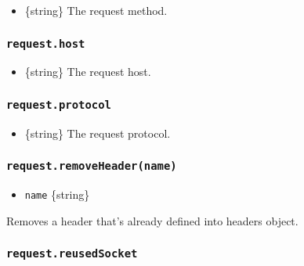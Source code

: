 \begin{itemize}
\tightlist
\item
  \{string\} The request method.
\end{itemize}

\subsubsection{\texorpdfstring{\texttt{request.host}}{request.host}}\label{request.host}

\begin{itemize}
\tightlist
\item
  \{string\} The request host.
\end{itemize}

\subsubsection{\texorpdfstring{\texttt{request.protocol}}{request.protocol}}\label{request.protocol}

\begin{itemize}
\tightlist
\item
  \{string\} The request protocol.
\end{itemize}

\subsubsection{\texorpdfstring{\texttt{request.removeHeader(name)}}{request.removeHeader(name)}}\label{request.removeheadername}

\begin{itemize}
\tightlist
\item
  \texttt{name} \{string\}
\end{itemize}

Removes a header that's already defined into headers object.

\begin{Shaded}
\begin{Highlighting}[]
\NormalTok{(}\NormalTok{)}\OperatorTok{;}
\end{Highlighting}
\end{Shaded}

\subsubsection{\texorpdfstring{\texttt{request.reusedSocket}}{request.reusedSocket}}\label{request.reusedsocket}

